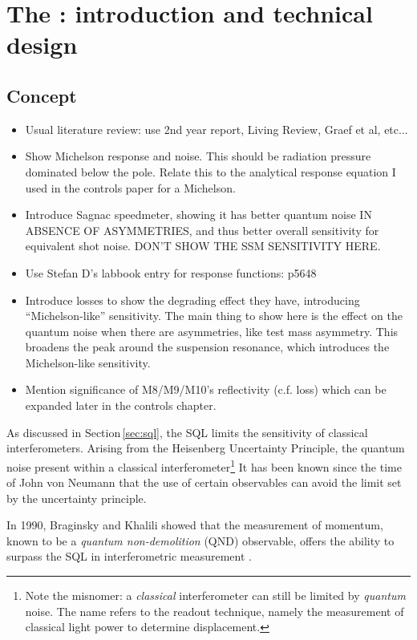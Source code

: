 \chapter{\label{c:speedmeter-intro}The \SSMEXPT{}: introduction and technical design}

\section{Concept}
\begin{itemize}
  \item Usual literature review: use 2nd year report, Living Review, Graef et al, etc...
  \item Show Michelson response and noise. This should be radiation pressure dominated below the pole. Relate this to the analytical response equation I used in the controls paper for a Michelson.
  \item Introduce Sagnac speedmeter, showing it has better quantum noise IN ABSENCE OF ASYMMETRIES, and thus better overall sensitivity for equivalent shot noise. DON'T SHOW THE SSM SENSITIVITY HERE.
  \item Use Stefan D's labbook entry for response functions: p5648
  \item Introduce losses to show the degrading effect they have, introducing ``Michelson-like'' sensitivity. The main thing to show here is the effect on the quantum noise when there are asymmetries, like test mass asymmetry. This broadens the peak around the suspension resonance, which introduces the Michelson-like sensitivity.
  \item Mention significance of M8/M9/M10's reflectivity (c.f. loss) which can be expanded later in the controls chapter.
\end{itemize}

As discussed in Section\,\ref{sec:sql}, the \gls{SQL} limits the sensitivity of classical interferometers. Arising from the Heisenberg Uncertainty Principle, the quantum noise present within a classical interferometer\footnote{Note the misnomer: a \emph{classical} interferometer can still be limited by \emph{quantum} noise. The name refers to the readout technique, namely the measurement of classical light power to determine displacement.} It has been known since the time of John von Neumann  that the use of certain observables can avoid the limit set by the uncertainty principle.

In 1990, Braginsky and Khalili showed that the measurement of momentum, known to be a \emph{quantum non-demolition} (\gls{QND}) observable, offers the ability to surpass the \gls{SQL} in interferometric measurement \cite{Braginsky1990}.

